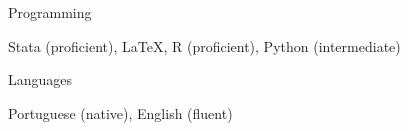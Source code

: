 \documentclass{resume} %
\begin{document}

\begin{rSection}{Programming}

Stata (proficient), \LaTeX, R (proficient), Python (intermediate)
\end{rSection}


\begin{rSection}{Languages}

Portuguese (native), English (fluent)
\end{rSection}
\end{document}
